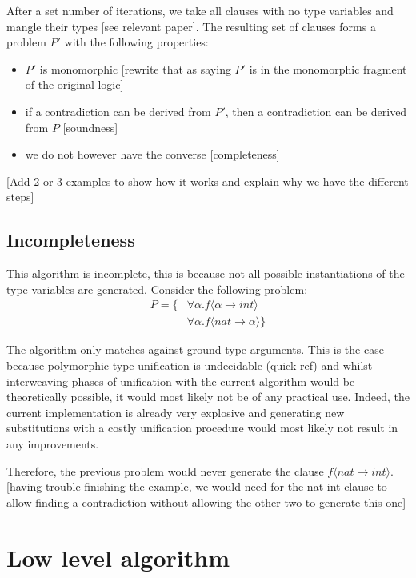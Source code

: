\documentclass{article}
\begin{document}
After a set number of iterations, we take all clauses with no type variables and mangle their types [see relevant paper]. The resulting set of clauses forms a problem \(P'\) with the following properties:
\begin{itemize}
   \item \(P'\) is monomorphic [rewrite that as saying \(P'\) is in the monomorphic fragment of the original logic]
   \item if a contradiction can be derived from \(P'\), then a contradiction can be derived from \(P\) [soundness]
   \item we do not however have the converse [completeness]
\end{itemize}

[Add 2 or 3 examples to show how it works and explain why we have the different steps]

\subsection{Incompleteness}

This algorithm is incomplete, this is because not all possible instantiations of the type variables are generated.
Consider the following problem: 
\begin{align*}
   P = \{ & \forall \alpha. f \langle \alpha \rightarrow int \rangle \\
          & \forall \alpha. f \langle nat \rightarrow \alpha \rangle \}
\end{align*}

The algorithm only matches against ground type arguments. This is the case because polymorphic type unification is undecidable (quick ref) and whilst interweaving phases of unification with the current algorithm would be theoretically possible, it would most likely not be of any practical use. Indeed, the current implementation is already very explosive and generating new substitutions with a costly unification procedure would most likely not result in any improvements.


Therefore, the previous problem would never generate the clause \(f \langle nat \rightarrow int \rangle\).
[having trouble finishing the example, we would need for the nat int clause to allow finding a contradiction
without allowing the other two to generate this one]

\section{Low level algorithm}
\end{document}

